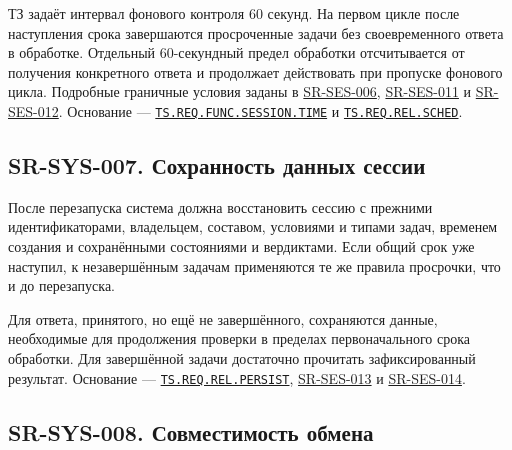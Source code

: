 \documentclass[12pt,a4paper]{article}
\begin{document}
ТЗ задаёт интервал фонового контроля 60 секунд. На первом цикле после наступления срока завершаются просроченные задачи без своевременного ответа в обработке. Отдельный 60-секундный предел обработки отсчитывается от получения конкретного ответа и продолжает действовать при пропуске фонового цикла. Подробные граничные условия заданы в {\hyperlink{sr-ses-006}{SR-SES-006}}, {\hyperlink{sr-ses-011}{SR-SES-011}} и {\hyperlink{sr-ses-012}{SR-SES-012}}. Основание --- {\href{../02\_Техническое\_задание/Техническое\_задание.pdf\#ts-req-func-session-time}{\texttt{TS.\allowbreak{}REQ.\allowbreak{}FUNC.\allowbreak{}SESSION.\allowbreak{}TIME}}} и {\href{../02\_Техническое\_задание/Техническое\_задание.pdf\#ts-req-rel-sched}{\texttt{TS.\allowbreak{}REQ.\allowbreak{}REL.\allowbreak{}SCHED}}}.

\subsection{SR-SYS-007. Сохранность данных сессии}\label{sr-sys-007-ux441ux43eux445ux440ux430ux43dux43dux43eux441ux442ux44c-ux434ux430ux43dux43dux44bux445-ux441ux435ux441ux441ux438ux438}

\hypertarget{sr-sys-007-сохранность-данных-сессии}{}

\hypertarget{sr-sys-007}{}

После перезапуска система должна восстановить сессию с прежними идентификаторами, владельцем, составом, условиями и типами задач, временем создания и сохранёнными состояниями и вердиктами. Если общий срок уже наступил, к незавершённым задачам применяются те же правила просрочки, что и до перезапуска.

Для ответа, принятого, но ещё не завершённого, сохраняются данные, необходимые для продолжения проверки в пределах первоначального срока обработки. Для завершённой задачи достаточно прочитать зафиксированный результат. Основание --- {\href{../02\_Техническое\_задание/Техническое\_задание.pdf\#ts-req-rel-persist}{\texttt{TS.\allowbreak{}REQ.\allowbreak{}REL.\allowbreak{}PERSIST}}}, {\hyperlink{sr-ses-013}{SR-SES-013}} и {\hyperlink{sr-ses-014}{SR-SES-014}}.

\subsection{SR-SYS-008. Совместимость обмена}\label{sr-sys-008-ux441ux43eux432ux43cux435ux441ux442ux438ux43cux43eux441ux442ux44c-ux43eux431ux43cux435ux43dux430}

\hypertarget{sr-sys-008-совместимость-обмена}{}
\end{document}
